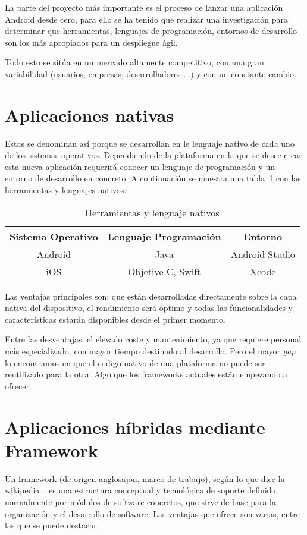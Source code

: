 
La parte del proyecto más importante es el proceso de lanzar una aplicación Android desde cero, para ello se ha tenido que realizar una investigación para determinar que herramientas, lenguajes de programación, entornos de desarrollo son los más apropiados para un despliegue ágil.

Todo esto se sitúa en un mercado altamente competitivo, con una gran variabilidad (usuarios, empresas, desarrolladores ...) y con un constante cambio. 

\section{Aplicaciones nativas}
Estas se denominan así porque se desarrollan en le lenguaje nativo de cada uno de los sistemas operativos. Dependiendo de la plataforma en la que se desee crear esta nueva aplicación requerirá conocer un lenguaje de programación y un entorno de desarrollo en concreto. A continuación se muestra una tabla~\ref{table:nativos} con las herramientas y lenguajes nativos:

\begin{table}[H]
	\begin{center}
		\begin{tabular}{ccc}
			\hline
			Sistema Operativo                        & Lenguaje Programación & Entorno \\ \hline
			Android				    & Java      & Android Studio					\\
			iOS			    & Objetive C, Swift       & Xcode						\\ \hline
		\end{tabular}
		\caption{Herramientas y lenguaje nativos}
		\label{table:nativos}
	\end{center}
\end{table}

Las ventajas principales son: que están desarrolladas directamente sobre la capa nativa del dispositivo, el rendimiento será óptimo y todas las funcionalidades y características estarán disponibles desde el primer momento.

Entre las desventajas: el elevado coste y mantenimiento, ya que requiere personal más especializado, con mayor tiempo destinado al desarrollo. Pero el mayor \emph{gap} lo encontramos en que el codigo nativo de una plataforma no puede ser reutilizado para la otra. Algo que los frameworks actuales están empezando a ofrecer.

\section{Aplicaciones híbridas mediante Framework}
Un framework (de origen anglosajón, marco de trabajo), según lo que dice la wikipedia~\cite{wiki:framework}, es una estructura conceptual y tecnológica de soporte definido, normalmente por módulos de software concretos, que sirve de base para la organización y el desarrollo de software. Las ventajas que ofrece son varias, entre las que se puede destacar:

